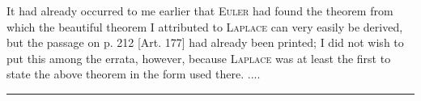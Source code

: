 It had already occurred to me earlier that \textsc{Euler} had found the theorem from which the beautiful theorem I attributed to \textsc{Laplace} can very easily be derived, but the passage on p. 212 [Art. 177] had already been printed; I did not wish to put this among the errata, however, because \textsc{Laplace} was at least the first to state the above theorem in the form used there. ....
\begin{center}\rule{.18\textwidth}{.35pt}\end{center}
